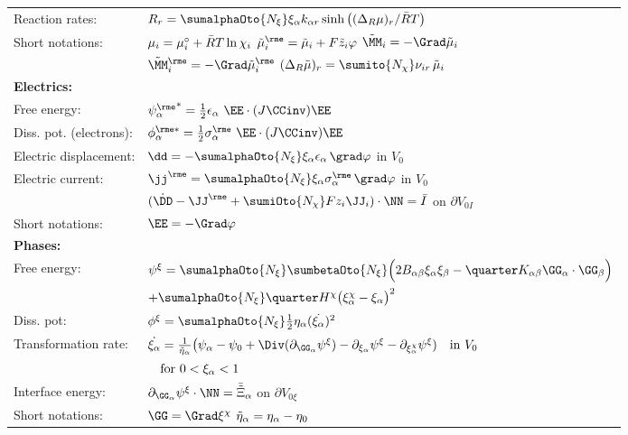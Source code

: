 \begin{table}[H]
\begin{tabular}{| l l |}
    Reaction rates: & $R_r = \sumalphaOto{\Nxi}\xia k_{\alpha r} \sinh\big((\Delta_R\mu)_r/\RT \big)$ \\
    Short notations: & $\mu_i = \mu^{\circ}_i + \bar{R}T\ln\chi_{i}$ \qquad $\muetilde_i = \tilde\mu_i + F\tilde z_i \varphi$ \qquad $\tilde\MM_i = -\Grad\tilde\mu_i$ \\
    &   $\MMetilde_i = -\Grad\muetilde_i$ \qquad $(\Delta_R\tilde\mu)_r=\sumito{\Nchi}\nuir\,\tilde\mu_i $  \\
    \hline
    \bf Electrics: & \\
    Free energy: & $\psieas = \frac{1}{2}\epsilon_{\alpha} \ \EE \cdot (J\CCinv)\EE$ \\
    Diss. pot. (electrons): & $\phies_{\alpha} = \frac{1}{2} \sigmaea \ \EE \cdot (J\CCinv)\EE$ \\
    Electric displacement: & $\dd = - \sumalphaOto{\Nxi}\xia\epsilon_\alpha \, \grad\varphi$ \quad in $V_0$\\
    Electric current: & $\jje = \sumalphaOto{\Nxi}\xia\sigmaea \, \grad\varphi$ \quad in $V_0$ \\
    & $(\dot\DD-\JJe+\sumiOto{\Nchi}Fz_i\JJ_i)\cdot\NN = \bar I$ \quad on $\partial V_{0I}$\\
    Short notations: & $\EE = -\Grad \varphi$ \\
    \hline
    \bf Phases: & \\
    Free energy: & $\psixi = \sumalphaOto{\Nxi} \sumbetaOto{\Nxi} \Big(2\Bab\xia\xib - \quarter \Kab \GGa\cdot\GGb \Big)$ \\
           & \qquad $+ \sumalphaOto{\Nxi}\quarter\Hchi\big(\xichia-\xia\big)^2$ \\
    Diss. pot: & $\phixi = \sumalphaOto{\Nxi}\frac{1}{2}\etaa\smash{(\dot\xia)}^2$ \\
    Transformation rate: & $\dot \xia = \frac{1}{\etaatilde} \big( \psi_\alpha-\psi_0 + \Div(\dGGa\psixi) - \dxia\psixi - \dxichia\psixi) \quad \text{in } V_0$ \\ 
    & $\quad \text{for } 0<\xi_\alpha<1$\\
    Interface energy: & $\dGGa\psixi \cdot \NN = \bar{\tilde\Xi}_\alpha$ \quad on $\partial V_{0\xi}$ \\
    Short notations: & $\GG=\Grad\xichi$ \quad $\tilde\eta_\alpha=\eta_{\alpha}-\eta_0$ \\
    \hline
  \end{tabular}
  \label{tab:optCond2}
\end{table}

\newpage


